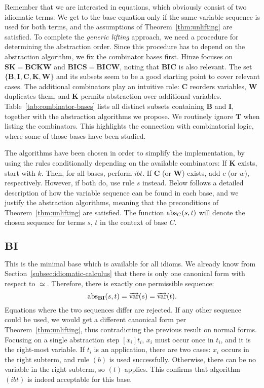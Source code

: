 Remember that we are interested in equations, which obviously consist of two
idiomatic terms.
We get to the base equation only if the same variable sequence is used for both
terms, and the assumptions of Theorem~\ref{thm:unlifting} are satisfied.
To complete the \emph{generic lifting} approach, we need a procedure for
determining the abstraction order.
Since this procedure has to depend on the abstraction algorithm, we fix the
combinator bases first.
Hinze focuses on $\mathbf{SK = BCKW}$ and $\mathbf{BICS = BICW}$, noting
that $\mathbf{BIC}$ is also relevant.
The set $\{\mathbf{B,I,C,K,W}\}$ and its subsets seem to be a good starting
point to cover relevant cases.
The additional combinators play an intuitive role:
$\mathbf{C}$ reorders variables, $\mathbf{W}$ duplicates them, and $\mathbf{K}$
permits abstraction over additional variables.
Table~\ref{tab:combinator-bases} lists all distinct subsets containing
$\mathbf{B}$ and $\mathbf{I}$, together with the abstraction algorithms we
propose.
We routinely ignore $\mathbf{T}$ when listing the combinators.
This highlights the connection with combinatorial logic, where some of those
bases have been studied.

The algorithms have been chosen in order to simplify the implementation, by
using the rules conditionally depending on the available combinators:
If $\mathbf{K}$ exists, start with $k$.
Then, for all bases, perform $ibt$.
If $\mathbf{C}$ (or $\mathbf{W}$) exists, add $c$ (or $w$), respectively.
However, if both do, use rule $s$ instead.
Below follows a detailed description of how the variable sequence can be found
in each base, and we justify the abstraction algorithms, meaning that the
preconditions of Theorem~\ref{thm:unlifting} are satisfied.
The function $\operatorname{abs}_C(s,t)$ will denote the chosen sequence for terms $s$, $t$
in the context of base $C$.

\subsection*{$\mathbf{BI}$}\label{subsec:base-bi}

This is the minimal base which is available for all idioms.
We already know from Section~\ref{subsec:idiomatic-calculus} that there is only
one canonical form with respect to $\simeq$.
Therefore, there is exactly one permissible sequence:
\[ \operatorname{abs}_\mathbf{BI}(s,t) = \overrightarrow{\operatorname{var}}(s) = \overrightarrow{\operatorname{var}}(t). \]
Equations where the two sequences differ are rejected.
If any other sequence could be used, we would get a different canonical form
per Theorem~\ref{thm:unlifting}, thus contradicting the previous result on
normal forms.
Focusing on a single abstraction step $[x_i]t_i$, $x_i$ must occur once in
$t_i$, and it is the right-most variable.
If $t_i$ is an application, there are two cases:
$x_i$ occurs in the right subterm, and rule $(b)$ is used successfully.
Otherwise, there can be no variable in the right subterm, so $(t)$ applies.
This confirms that algorithm $(ibt)$ is indeed acceptable for this base.

